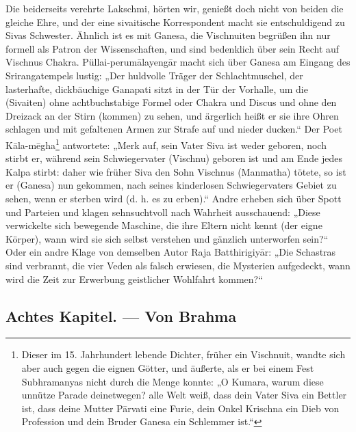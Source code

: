 \documentclass{article}
\begin{document}
Die beiderseits verehrte Lakschmi, hörten wir, genießt doch nicht von beiden die gleiche Ehre, und der eine sivaitische Korrespondent macht sie entschuldigend zu Sivas Schwester. Ähnlich ist es mit Ganesa, die Vischnuiten begrüßen ihn nur formell als Patron der Wissenschaften, und sind bedenklich über sein Recht auf Vischnus Chakra. Püllai-perum\={a}layeng\={a}r macht sich über Ganesa am Eingang des Srirangatempels lustig: „Der huldvolle Träger der Schlachtmuschel, der lasterhafte, dickbäuchige Ganapati sitzt in der Tür der Vorhalle, um die (Sivaiten) ohne achtbuchstabige Formel oder Chakra und Discus und ohne den Dreizack an der Stirn (kommen) zu sehen, und ärgerlich heißt er sie ihre Ohren schlagen und mit gefaltenen Armen zur Strafe auf und nieder ducken.“ Der Poet K\={a}la-m\={e}gha\footnote{Dieser im 15. Jahrhundert lebende Dichter, früher ein Vischnuit, wandte sich aber auch gegen die eignen Götter, und äußerte, als er bei einem Fest Subhramanyas nicht durch die Menge konnte: „O Kumara, warum diese unnütze Parade deinetwegen? alle Welt weiß, dass dein Vater Siva ein Bettler ist, dass deine Mutter P\={a}rvati eine Furie, dein Onkel Krischna ein Dieb von Profession und dein Bruder Ganesa ein Schlemmer ist.“} antwortete: „Merk auf, sein Vater Siva ist weder geboren, noch stirbt er, während sein Schwiegervater (Vischnu) geboren ist und am Ende jedes Kalpa stirbt: daher wie früher Siva den Sohn Vischnus (Manmatha) tötete, so ist er (Ganesa) nun gekommen, nach seines kinderlosen Schwiegervaters Gebiet zu sehen, wenn er sterben wird (d. h. es zu erben).“ Andre erheben sich über Spott und Parteien und klagen sehnsuchtvoll nach Wahrheit ausschauend: „Diese verwickelte sich bewegende Maschine, die ihre Eltern nicht kennt (der eigne Körper), wann wird sie sich selbst verstehen und gänzlich unterworfen sein?“ Oder ein andre Klage von demselben Autor Raja Batthirigiy\={a}r: „Die Schastras sind verbrannt, die vier Veden als falsch erwiesen, die Mysterien aufgedeckt, wann wird die Zeit zur Erwerbung geistlicher Wohlfahrt kommen?“

\clearpage
\subsection{Achtes Kapitel. — Von Brahma}
\end{document}
